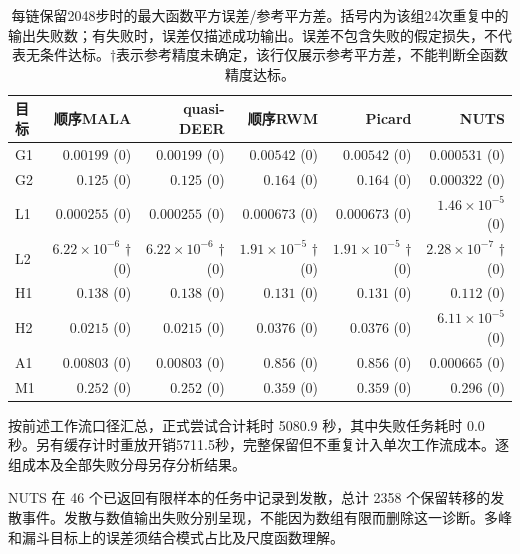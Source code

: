 \begin{table}[htbp]\centering\small\setlength{\tabcolsep}{3pt}\begin{tabular}{lrrrrr}\toprule

目标 & 顺序MALA & quasi-DEER & 顺序RWM & Picard & NUTS\\\midrule

G1 & $0.00199$ (0) & $0.00199$ (0) & $0.00542$ (0) & $0.00542$ (0) & $0.000531$ (0)\\

G2 & $0.125$ (0) & $0.125$ (0) & $0.164$ (0) & $0.164$ (0) & $0.000322$ (0)\\

L1 & $0.000255$ (0) & $0.000255$ (0) & $0.000673$ (0) & $0.000673$ (0) & $1.46\times10^{-5}$ (0)\\

L2 & $6.22\times10^{-6}$ $\dagger$ (0) & $6.22\times10^{-6}$ $\dagger$ (0) & $1.91\times10^{-5}$ $\dagger$ (0) & $1.91\times10^{-5}$ $\dagger$ (0) & $2.28\times10^{-7}$ $\dagger$ (0)\\

H1 & $0.138$ (0) & $0.138$ (0) & $0.131$ (0) & $0.131$ (0) & $0.112$ (0)\\

H2 & $0.0215$ (0) & $0.0215$ (0) & $0.0376$ (0) & $0.0376$ (0) & $6.11\times10^{-5}$ (0)\\

A1 & $0.00803$ (0) & $0.00803$ (0) & $0.856$ (0) & $0.856$ (0) & $0.000665$ (0)\\

M1 & $0.252$ (0) & $0.252$ (0) & $0.359$ (0) & $0.359$ (0) & $0.296$ (0)\\

\bottomrule\end{tabular}\caption{每链保留2048步时的最大函数平方误差/参考平方差。括号内为该组24次重复中的输出失败数；有失败时，误差仅描述成功输出。误差不包含失败的假定损失，不代表无条件达标。$\dagger$表示参考精度未确定，该行仅展示参考平方差，不能判断全函数精度达标。}\end{table}

按前述工作流口径汇总，正式尝试合计耗时 5080.9 秒，其中失败任务耗时 0.0 秒。另有缓存计时重放开销5711.5秒，完整保留但不重复计入单次工作流成本。逐组成本及全部失败分母另存分析结果。

NUTS 在 46 个已返回有限样本的任务中记录到发散，总计 2358 个保留转移的发散事件。发散与数值输出失败分别呈现，不能因为数组有限而删除这一诊断。多峰和漏斗目标上的误差须结合模式占比及尺度函数理解。

